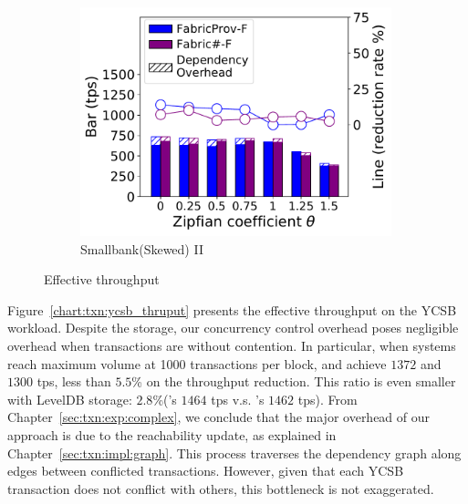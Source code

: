 \begin{figure}[t]
\begin{subfigure}{0.45\textwidth}
      \includegraphics[width=0.99\textwidth]{chart/txn/smallbank_prov.pdf}
      \caption{Smallbank(Skewed) II}
      \label{chart:txn:smallbank_prov}
    \end{subfigure}
    \caption{Effective throughput}
\end{figure}

Figure~\ref{chart:txn:ycsb_thruput} presents the effective throughput on the YCSB workload.
Despite the storage, our concurrency control overhead poses negligible overhead 
when transactions are without contention.
In particular, when systems reach maximum volume at 1000 transactions per block, {\fsO} and {\fsF} achieve $1372$ and $1300$ tps, less than $5.5$\% on the throughput reduction. 
This ratio is even smaller with LevelDB storage: $2.8$\%({\fsPrO}'s $1464$ tps v.s. {\fsPrF}'s $1462$ tps). 
From Chapter~\ref{sec:txn:exp:complex}, we conclude that the major overhead of our approach is due to the reachability update, as explained in Chapter~\ref{sec:txn:impl:graph}. 
This process traverses the dependency graph along edges between conflicted transactions. 
However, given that each YCSB transaction does not conflict with others, this bottleneck is not exaggerated.

